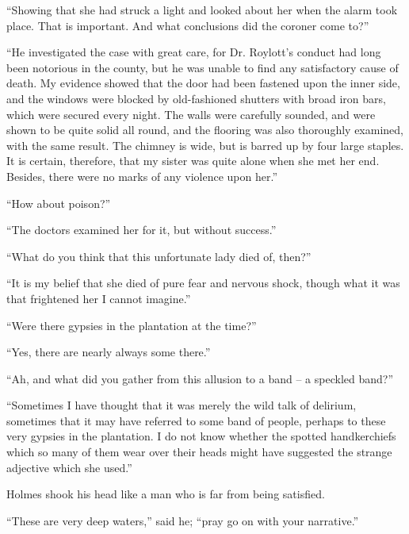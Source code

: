 “Showing that she had struck a light and looked about her
when the alarm took place. That is important. And what
conclusions did the coroner come to?”

“He investigated the case with great care, for Dr. Roylott’s
conduct had long been notorious in the county, but he was
unable to find any satisfactory cause of death. My evidence
showed that the door had been fastened upon the inner side,
and the windows were blocked by old-fashioned shutters with
broad iron bars, which were secured every night. The walls
were carefully sounded, and were shown to be quite solid all
round, and the flooring was also thoroughly examined, with
the same result. The chimney is wide, but is barred up by
four large staples. It is certain, therefore, that my sister was
quite alone when she met her end. Besides, there were no
marks of any violence upon her.”

“How about poison?”

“The doctors examined her for it, but without success.”

“What do you think that this unfortunate lady died of,
then?”

“It is my belief that she died of pure fear and nervous
shock, though what it was that frightened her I cannot
imagine.”

“Were there gypsies in the plantation at the time?”

“Yes, there are nearly always some there.”

“Ah, and what did you gather from this allusion to a band -- a
speckled band?”

“Sometimes I have thought that it was merely the wild talk
of delirium, sometimes that it may have referred to some band
of people, perhaps to these very gypsies in the plantation. I
do not know whether the spotted handkerchiefs which so
many of them wear over their heads might have suggested the
strange adjective which she used.”

Holmes shook his head like a man who is far from being
satisfied.

“These are very deep waters,” said he; “pray go on with
your narrative.”

